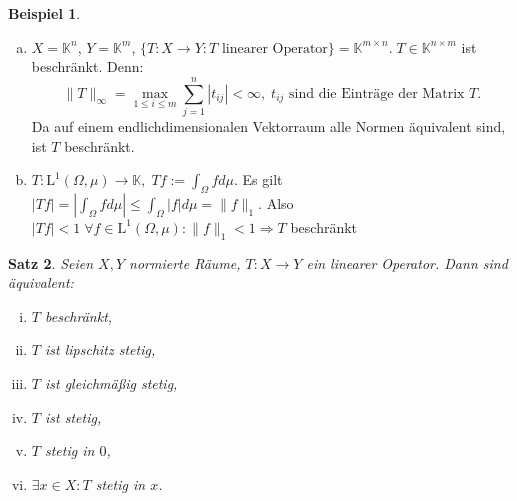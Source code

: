 \documentclass[ngerman]{report}
\theoremstyle{plain}%
\newtheorem{thm}{Satz}[chapter]
\theoremstyle{definition}%
\newtheorem{bsp}[thm]{Beispiel}
\theoremstyle{myStyle}
\newcommand{\C}{\mathbb{C}}
\newcommand{\R}{\mathbb{R}}
\newcommand{\K}{\mathbb{K}}
\newcommand{\lL}[2][\Omega,\mu]{\text{L}^{#2}(#1)} %
\newcommand{\norm}[1]{\|#1\|}
\newcommand{\intl}[1]{\int_\Omega #1 d\mu} %
\newcommand{\df}[1][]{%
	\overset{#1}{\Rightarrow}
}
\begin{document}
	\begin{bsp}
		\begin{enumerate}[a)]
			\item $X = \K^n$, $Y = \K^m$, $\{T: X\to Y: T \text{ linearer Operator}\} = \K^{m \times n}.\; T\in\K^{n \times m}$ ist beschränkt. 
			Denn: 
			$$\norm{T}_\infty = \max_{1\leq i \leq m} \sum^n_{j=1} |t_{ij}| < \infty,\; t_{ij} \text{ sind die Einträge der Matrix }T.$$ Da auf einem endlichdimensionalen Vektorraum alle Normen äquivalent sind, ist $T$ beschränkt.
			\item $T: \lL{1} \to \K, \; Tf := \intl{f}.$ 
				Es gilt $|Tf| = |\intl{f}| \leq \intl{|f|} = \norm{f}_1.$
				Also $|Tf| < 1 \; \forall f \in \lL{1}: \norm{f}_1 < 1 \df T$ beschränkt
		\end{enumerate}
	\end{bsp}

	\begin{thm}
		Seien $X,Y$ normierte Räume, $T: X\to Y$ ein linearer Operator. Dann sind äquivalent:
			\begin{enumerate}[(i)]
				\item $T$ beschränkt,
				\item $T$ ist lipschitz stetig,
				\item $T$ ist gleichmäßig stetig,
				\item $T$ ist stetig,
				\item $T$ stetig in $0$,
				\item $\exists x \in X: T$ stetig in $x$.
			\end{enumerate}
	\end{thm}

\end{document}
